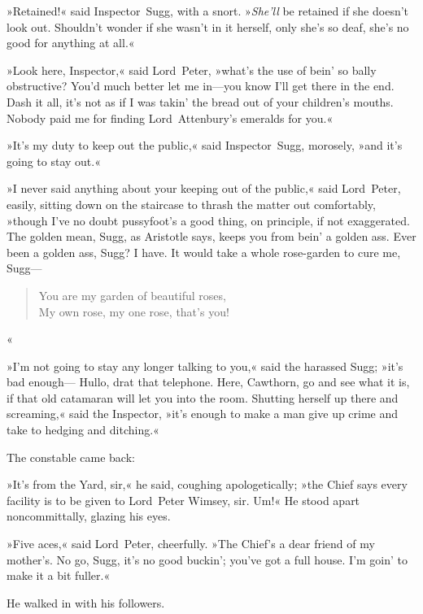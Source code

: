 »Retained!« said Inspector~Sugg, with a snort. »\textit{She'll} be retained if she doesn't look out. Shouldn't wonder if she wasn't in it herself, only she's so deaf, she's no good for anything at all.«

»Look here, Inspector,« said Lord~Peter, »what's the use of bein' so bally obstructive? You'd much better let me in—you know I'll get there in the end. Dash it all, it's not as if I was takin' the bread out of your children's mouths. Nobody paid me for finding Lord~Attenbury's emeralds for you.«

»It's my duty to keep out the public,« said Inspector~Sugg, morosely, »and it's going to stay out.«

»I never said anything about your keeping out of the public,« said Lord~Peter, easily, sitting down on the staircase to thrash the matter out comfortably, »though I've no doubt pussyfoot's a good thing, on principle, if not exaggerated. The golden mean, Sugg, as Aristotle says, keeps you from bein' a golden ass. Ever been a golden ass, Sugg? I have. It would take a whole rose-garden to cure me, Sugg—

\begin{verse}
You are my garden of beautiful roses,\\
My own rose, my one rose, that's you!\\
\end{verse}«

»I'm not going to stay any longer talking to you,« said the harassed Sugg; »it's bad enough— Hullo, drat that telephone. Here, Cawthorn, go and see what it is, if that old catamaran will let you into the room. Shutting herself up there and screaming,« said the Inspector, »it's enough to make a man give up crime and take to hedging and ditching.«

The constable came back:

»It's from the Yard, sir,« he said, coughing apologetically; »the Chief says every facility is to be given to Lord~Peter Wimsey, sir. Um!« He stood apart noncommittally, glazing his eyes.

»Five aces,« said Lord~Peter, cheerfully. »The Chief's a dear friend of my mother's. No go, Sugg, it's no good buckin'; you've got a full house. I'm goin' to make it a bit fuller.«

He walked in with his followers.

